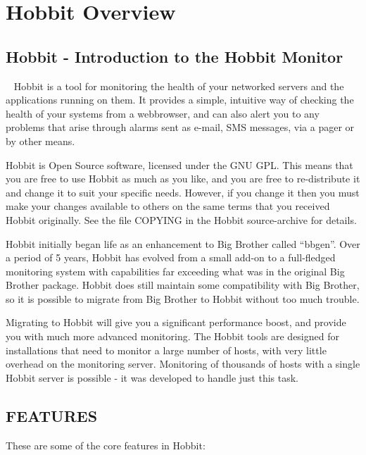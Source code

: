 %
\chapter{Hobbit Overview}
%
\section{Hobbit - Introduction to the Hobbit Monitor}

~\cite{web:patchutils} Hobbit is a tool for monitoring the health of your networked servers
 and the applications running on them. It provides a simple, intuitive
 way of checking the health of your systems from a webbrowser, and can
 also alert you to any problems that arise through alarms sent as
 e-mail, SMS messages, via a pager or by other means. 


 Hobbit is Open Source software, licensed under the GNU GPL. This
 means that you are free to use Hobbit as much as you like, and you
 are free to re-distribute it and change it to suit your specific
 needs. However, if you change it then you must make your changes
 available to others on the same terms that you received Hobbit
 originally. See the file COPYING in the Hobbit source-archive for
 details. 

 Hobbit initially began life as an enhancement to Big Brother called
 ``bbgen''. Over a period of 5 years, Hobbit has evolved from a small
 add-on to a full-fledged monitoring system with capabilities far
 exceeding what was in the original Big Brother package. Hobbit does
 still maintain some compatibility with Big Brother, so it is
 possible to migrate from Big Brother to Hobbit without too much
 trouble. 

 Migrating to Hobbit will give you a significant performance boost,
 and provide you with much more advanced monitoring. The Hobbit tools
 are designed for installations that need to monitor a large number
 of hosts, with very little overhead on the monitoring
 server. Monitoring of thousands of hosts with a single Hobbit server
 is possible - it was developed to handle just this task. 

\section{FEATURES}
 These are some of the core features in Hobbit: 

